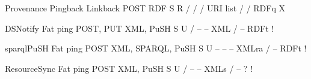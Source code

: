 \documentclass[a4paper]{llncs}
\begin{document}
                                            
                                                Provenance Pingback
                                                Linkback
                                                POST
                                                RDF
                                                S R
                                                /
                                                /
                                                /
                                                URI list
                                                /
                                                /
                                                RDFq
                                                X
                                            
                                            
                                                DSNotify
                                                Fat ping
                                                POST, PUT
                                                XML, PuSH
                                                S U
                                                /
                                                –
                                                –
                                                XML
                                                /
                                                –
                                                RDFt
                                                !
                                            
                                            
                                                sparqlPuSH
                                                Fat ping
                                                POST
                                                XML, SPARQL, PuSH
                                                S U
                                                –
                                                –
                                                –
                                                XMLra
                                                /
                                                –
                                                RDFt
                                                !
                                            
                                            
                                                ResourceSync
                                                Fat ping
                                                POST
                                                XML, PuSH
                                                S U
                                                /
                                                –
                                                –
                                                XMLs
                                                /
                                                –
                                                ?
                                                !
                                            
\end{document}
